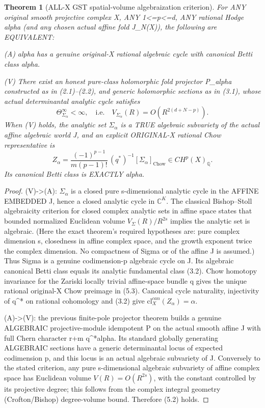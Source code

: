\documentclass[11pt]{article}
\newtheorem{theorem}{Theorem}[section]
\begin{document}
\begin{theorem}[ALL-X GST spatial-volume algebraization criterion]
For ANY original smooth projective complex X,
ANY 1<=p<=d, ANY rational Hodge alpha
(and any chosen actual affine fold J_N(X)),
the following are EQUIVALENT:

(A) alpha has a genuine original-X rational
algebraic cycle with canonical Betti class alpha.

(V) There exist an honest pure-class
holomorphic fold projector P_alpha constructed
as in (2.1)--(2.2), and generic holomorphic
sections as in (3.1), whose actual
determinantal analytic cycle satisfies
\[
 \boxed{
   \Theta_{\Sigma_\alpha}^{\infty}<\infty,
   \quad\text{i.e.}\quad
   V_{\Sigma_\alpha}(R)
       =O(R^{2(d+N-p)}).
 }                                                        \tag{5.2}
\]
When (V) holds, the analytic set
$\Sigma_\alpha$ is a TRUE algebraic
subvariety of the actual affine
algebraic world J, and an explicit
ORIGINAL-X rational Chow representative is
\[
 \boxed{
 Z_\alpha=
 \frac{(-1)^{p-1}}{m(p-1)!}\,
     (q^*)^{-1}[\Sigma_\alpha]_{\mathrm{Chow}}
       \in CH^p(X)_{\mathbb Q}.
 }                                                        \tag{5.3}
\]
Its canonical Betti class is EXACTLY alpha.
\end{theorem}
\begin{proof}
(V)->(A): $\Sigma_\alpha$ is a closed
pure s-dimensional analytic cycle in the
AFFINE EMBEDDED J, hence a closed
analytic cycle in $\mathbb C^K$.
The classical Bishop--Stoll
algebraicity criterion for closed
complex analytic sets in affine space
states that bounded normalized Euclidean
volume $V_\Sigma(R)/R^{2s}$ implies the
analytic set is algebraic.
(Here the exact theorem's required
hypotheses are: pure complex dimension s,
closedness in affine complex space, and
the growth exponent twice the complex
dimension. No compactness of Sigma or
of the affine J is assumed.)
Thus Sigma is a genuine codimension-p
algebraic cycle on J. Its algebraic
canonical Betti class equals its
analytic fundamental class (3.2).
Chow homotopy invariance for the
Zariski locally trivial affine-space
bundle q gives the unique rational
original-X Chow preimage in (5.3).
Canonical cycle naturality, injectivity
of q^* on rational cohomology and
(3.2) give $\mathrm{cl}_X^{can}(Z_\alpha)=\alpha$.

(A)->(V): the previous finite-pole
projector theorem builds a genuine
ALGEBRAIC projective-module idempotent
P on the actual smooth affine J with
full Chern character r+m q^*alpha.
Its standard globally generating
ALGEBRAIC sections have a generic
determinantal locus of expected
codimension p, and this locus is
an actual algebraic subvariety of J.
Conversely to the stated criterion,
any pure s-dimensional algebraic
subvariety of affine complex space
has Euclidean volume
$V(R)=O(R^{2s})$, with the constant
controlled by its projective degree;
this follows from the complex
integral geometry (Crofton/Bishop)
degree-volume bound.
Therefore (5.2) holds.
\end{proof}
\end{document}
